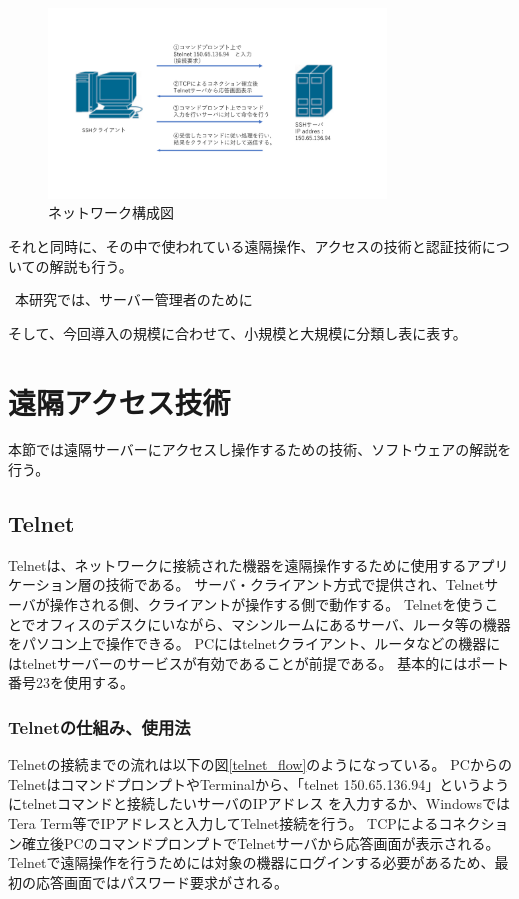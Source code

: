\documentclass[12pt,a4paper,titlepage]{jsarticle}
\begin{document}
\begin{figure}[H]
    \centering
    \includegraphics*[width=0.8\textwidth,page=2]{graphs/network_archtecture.pdf}
    \caption{ネットワーク構成図}
    \label{network_graph}
\end{figure}

それと同時に、その中で使われている遠隔操作、アクセスの技術と認証技術についての解説も行う。





\ 本研究では、サーバー管理者のために

そして、今回導入の規模に合わせて、小規模と大規模に分類し表に表す。

\section{遠隔アクセス技術}
本節では遠隔サーバーにアクセスし操作するための技術、ソフトウェアの解説を行う。

\subsection{Telnet}
Telnetは、ネットワークに接続された機器を遠隔操作するために使用するアプリケーション層の技術である。
サーバ・クライアント方式で提供され、Telnetサーバが操作される側、クライアントが操作する側で動作する。
Telnetを使うことでオフィスのデスクにいながら、マシンルームにあるサーバ、ルータ等の機器をパソコン上で操作できる。
PCにはtelnetクライアント、ルータなどの機器にはtelnetサーバーのサービスが有効であることが前提である。
基本的にはポート番号23を使用する。


\subsubsection{Telnetの仕組み、使用法}
Telnetの接続までの流れは以下の図\ref{telnet_flow}のようになっている。
PCからのTelnetはコマンドプロンプトやTerminalから、「telnet 150.65.136.94」というようにtelnetコマンドと接続したいサーバのIPアドレス
を入力するか、WindowsではTera Term等でIPアドレスと入力してTelnet接続を行う。
TCPによるコネクション確立後PCのコマンドプロンプトでTelnetサーバから応答画面が表示される。
Telnetで遠隔操作を行うためには対象の機器にログインする必要があるため、最初の応答画面ではパスワード要求がされる。
\end{document}
